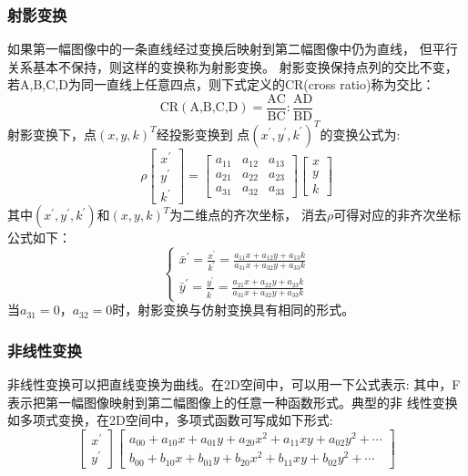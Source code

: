 \subsubsection{射影变换}
如果第一幅图像中的一条直线经过变换后映射到第二幅图像中仍为直线，
但平行关系基本不保持，则这样的变换称为射影变换。
射影变换保持点列的交比不变，
若A,B,C,D为同一直线上任意四点，则下式定义的CR(cross ratio)称为交比：
\begin{equation}
  \text{CR}(\text{A,B,C,D})=
  \frac{\text{AC}}{\text{BC}}:\frac{\text{AD}}{\text{BD}}
\end{equation}
射影变换下，点$(x,y,k)^T$经投影变换到
点$(x^\prime,y^\prime,k^\prime)^T$的变换公式为:
\begin{equation}
  \rho
  \begin{bmatrix}
    x^\prime\\y^\prime\\k^\prime
  \end{bmatrix}=
  \begin{bmatrix}
    a_{11}& a_{12}& a_{13}\\
    a_{21}& a_{22}& a_{23}\\
    a_{31}& a_{32}& a_{33}
  \end{bmatrix}
  \begin{bmatrix}
    x\\y\\k
  \end{bmatrix}
\end{equation}
其中$(x^\prime,y^\prime,k^\prime)$和$(x,y,k)^T$为二维点的齐次坐标，
消去$\rho$可得对应的非齐次坐标公式如下：
\begin{equation}
  \begin{cases}
    \bar{x}^\prime=\frac{x^\prime}{k^\prime}=
    \frac{a_{11}x+a_{12}y+a_{13}k}{a_{31}x+a_{32}y+a_{33}k}\\
    \bar{y}^\prime=\frac{y^\prime}{k^\prime}=
    \frac{a_{21}x+a_{22}y+a_{23}k}{a_{31}x+a_{32}y+a_{33}k}
  \end{cases}
\end{equation}
当$a_{31}=0$，$a_{32}=0$时，射影变换与仿射变换具有相同的形式。
\subsubsection{非线性变换}
非线性变换可以把直线变换为曲线。在2D空间中，可以用一下公式表示:
其中，F表示把第一幅图像映射到第二幅图像上的任意一种函数形式。典型的非
线性变换如多项式变换，在2D空间中，多项式函数可写成如下形式:
\begin{equation}
  \begin{bmatrix}
    x^\prime\\y^\prime
  \end{bmatrix}
  \begin{bmatrix}
    a_{00}+a_{10}x+a_{01}y+a_{20}x^2+a_{11}xy+a_{02}y^2+\cdots\\
    b_{00}+b_{10}x+b_{01}y+b_{20}x^2+b_{11}xy+b_{02}y^2+\cdots
  \end{bmatrix}
\end{equation}

